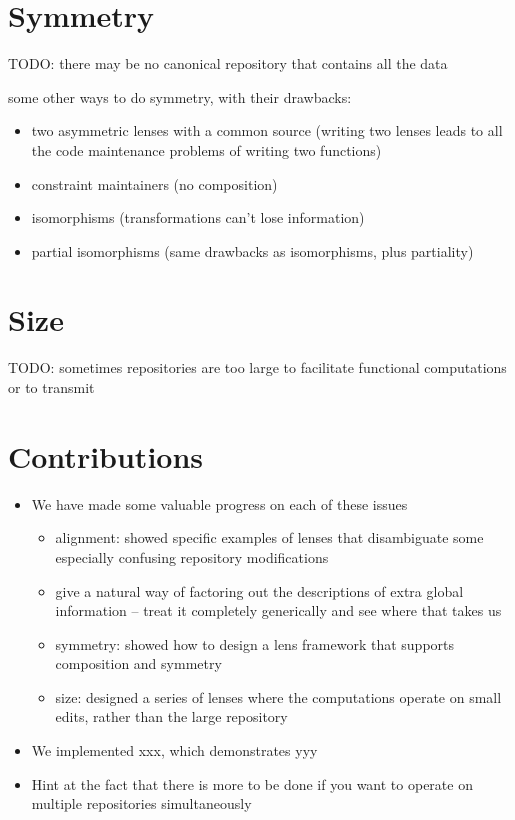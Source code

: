 
\section{Symmetry}
\label{sec:intro-symmetry}
TODO: there may be no canonical repository that contains all the data

some other ways to do symmetry, with their drawbacks:
\begin{itemize}
    \item two asymmetric lenses with a common source (writing two lenses
        leads to all the code maintenance problems of writing two functions)
    \item constraint maintainers (no composition)
    \item isomorphisms (transformations can't lose information)
    \item partial isomorphisms (same drawbacks as isomorphisms, plus
        partiality)
\end{itemize}

\section{Size}
\label{sec:intro-size}
TODO: sometimes repositories are too large to facilitate functional
computations or to transmit

\section{Contributions}
\label{sec:intro-contributions}
\begin{itemize}
    \item We have made some valuable progress on each of these issues
        \begin{itemize}
            \item alignment: showed specific examples of lenses that
                disambiguate some especially confusing repository
                modifications
            \item give a natural way of factoring out the descriptions of
                extra global information -- treat it completely generically
                and see where that takes us
            \item symmetry: showed how to design a lens framework that
                supports composition and symmetry
            \item size: designed a series of lenses where the computations
                operate on small edits, rather than the large repository
        \end{itemize}
    \item We implemented xxx, which demonstrates yyy
    \item Hint at the fact that there is more to be done if you want to
        operate on multiple repositories simultaneously
\end{itemize}
